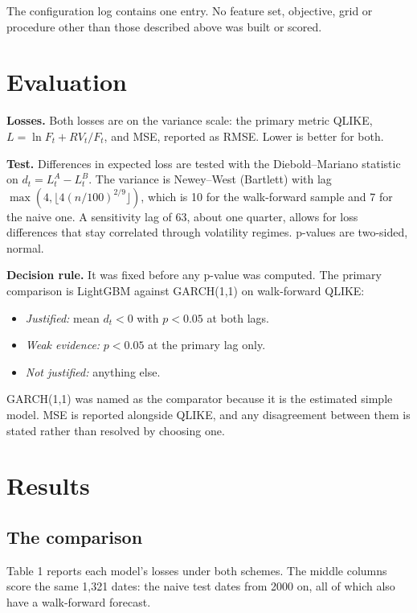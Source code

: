\documentclass[11pt]{article}
\providecommand{\tightlist}{\setlength{\itemsep}{0pt}\setlength{\parskip}{0pt}}
\begin{document}
The configuration log contains one entry. No feature set, objective, grid
or procedure other than those described above was built or scored.

\hypertarget{evaluation}{%
\section{Evaluation}\label{evaluation}}

\textbf{Losses.} Both losses are on the variance scale: the primary metric
QLIKE, \(L = \ln F_t + RV_t / F_t\), and MSE, reported as RMSE. Lower is
better for both.

\textbf{Test.} Differences in expected loss are tested with the
Diebold--Mariano statistic on \(d_t = L_t^{A} - L_t^{B}\). The variance is
Newey--West (Bartlett) with lag \(\max(4, \lfloor 4 (n/100)^{2/9} \rfloor)\),
which is 10 for the walk-forward sample and 7 for the naive one. A
sensitivity lag of 63, about one quarter, allows for loss differences that
stay correlated through volatility regimes. p-values are two-sided,
normal.

\textbf{Decision rule.} It was fixed before any p-value was computed. The
primary comparison is LightGBM against GARCH(1,1) on walk-forward QLIKE:

\begin{itemize}
\tightlist
\item
  \emph{Justified:} mean \(d_t < 0\) with \(p < 0.05\) at both lags.
\item
  \emph{Weak evidence:} \(p < 0.05\) at the primary lag only.
\item
  \emph{Not justified:} anything else.
\end{itemize}

GARCH(1,1) was named as the comparator because it is the estimated simple
model. MSE is reported alongside QLIKE, and any disagreement between them
is stated rather than resolved by choosing one.

\hypertarget{results}{%
\section{Results}\label{results}}

\hypertarget{the-comparison}{%
\subsection{The comparison}\label{the-comparison}}

Table 1 reports each model's losses under both schemes. The middle columns
score the same 1,321 dates: the naive test dates from 2000 on, all of which
also have a walk-forward forecast.
\end{document}
